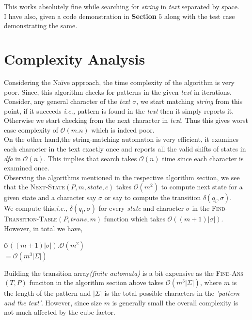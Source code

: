 \documentclass[12pt,a4paper]{article}%
\begin{document}
	\begin{flushleft}
		This works absolutely fine while searching for \textit{string} in \textit{text} separated by space.\\ I have also, given a code demonstration in \textbf{Section} $5$ along with the test case demonstrating the same.
	\end{flushleft}
	\pagebreak
	
	
	\section{Complexity Analysis}
	\begin{flushleft}
	Considering the Naïve approach, the time complexity of the algorithm is very poor. Since, this algorithm checks for patterns in the given \textit{text} in iterations. Consider, any general character of the \textit{text} $\sigma$, we start matching \textit{string} from this point, if it succeeds \textit{i.e.,} pattern is found in the \textit{text} then it simply reports it. Otherwise we start checking from the next character in \textit{text}. Thus this gives worst case complexity of $\mathcal{O}(m.n)$ which is indeed poor.\\\bigskip
	On the other hand,the string-matching automaton is very efficient, it examines each character in the text exactly once and reports all the valid shifts of states in \textit{dfa} in $\mathcal{O}(n)$. This implies that search takes $\mathcal{O}(n)$ time since each character is examined once.\\\bigskip
	Observing the algorithms mentioned in the respective algorithm section, we see that the \textsc{Next-State}$(P,m,state,c)$ takes $\mathcal{O}(m^{2})$ to compute next state for a given state and a character say $\sigma$ or say to compute the transition $\delta(q_i,\sigma)$.\\\bigskip
	We compute this,\textit{i.e.,} $\delta(q_i,\sigma)$ for every \textit{state} and character $\sigma$ in the \textsc{Find-Transition-Table}$(P,trans,m)$ function which takes $\mathcal{O}((m+1)|\sigma|)$. However, in total we have,
	\begin{center}
		$\mathcal{O}((m+1)|\sigma|)$.$\mathcal{O}(m^{2})$\\\smallskip
		$=\mathcal{O}(m^{3}|\Sigma|)$
	\end{center}
	Building the transition array\textit{(finite automata)} is a bit expensive as the \textsc{Find-Ans}$(T,P)$ funciton in the algorithm section above takes $\mathcal{O}(m^{3}|\Sigma|)$, where $m$ is the length of the pattern and $|\Sigma|$ is the total possible characters in the \textit{'pattern and the text'}. However, since size $m$ is generally small the overall complexity is not much affected by the cube factor.\\\bigskip

\end{flushleft}
\end{document}
